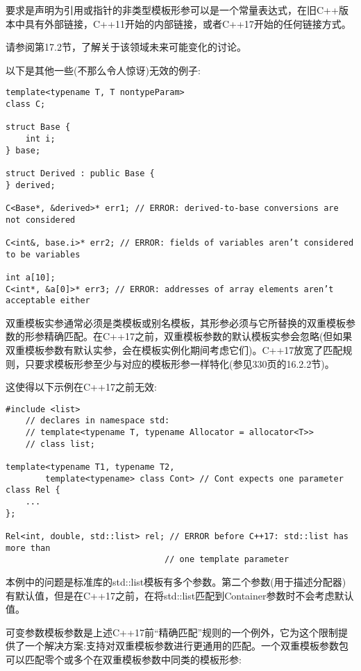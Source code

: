 要求是声明为引用或指针的非类型模板形参可以是一个常量表达式，在旧C++版本中具有外部链接，C++11开始的内部链接，或者C++17开始的任何链接方式。

请参阅第17.2节，了解关于该领域未来可能变化的讨论。

以下是其他一些(不那么令人惊讶)无效的例子:

\begin{lstlisting}[style=styleCXX]
template<typename T, T nontypeParam>
class C;

struct Base {
	int i;
} base;

struct Derived : public Base {
} derived;

C<Base*, &derived>* err1; // ERROR: derived-to-base conversions are not considered

C<int&, base.i>* err2; // ERROR: fields of variables aren’t considered to be variables

int a[10];
C<int*, &a[0]>* err3; // ERROR: addresses of array elements aren’t acceptable either
\end{lstlisting}



双重模板实参通常必须是类模板或别名模板，其形参必须与它所替换的双重模板参数的形参精确匹配。在C++17之前，双重模板参数的默认模板实参会忽略(但如果双重模板参数有默认实参，会在模板实例化期间考虑它们)。C++17放宽了匹配规则，只要求模板形参至少与对应的模板形参一样特化(参见330页的16.2.2节)。

这使得以下示例在C++17之前无效:

\begin{lstlisting}[style=styleCXX]
#include <list>
	// declares in namespace std:
	// template<typename T, typename Allocator = allocator<T>>
	// class list;

template<typename T1, typename T2,
		template<typename> class Cont> // Cont expects one parameter
class Rel {
	...
};

Rel<int, double, std::list> rel; // ERROR before C++17: std::list has more than
								// one template parameter
\end{lstlisting}

本例中的问题是标准库的std::list模板有多个参数。第二个参数(用于描述分配器)有默认值，但是在C++17之前，在将std::list匹配到Container参数时不会考虑默认值。

可变参数模板参数是上述C++17前“精确匹配”规则的一个例外，它为这个限制提供了一个解决方案:支持对双重模板参数进行更通用的匹配。一个双重模板参数包可以匹配零个或多个在双重模板参数中同类的模板形参:

